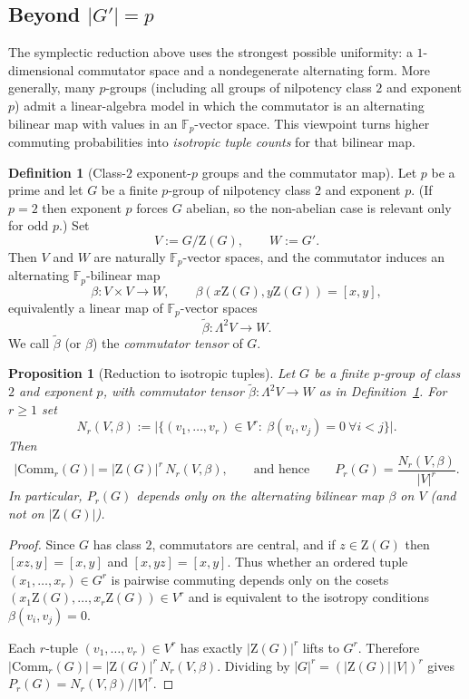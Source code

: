 \documentclass[11pt]{article}
\newtheorem{proposition}[theorem]{Proposition}
\theoremstyle{definition}
\newtheorem{definition}[theorem]{Definition}
\theoremstyle{remark}
\theoremstyle{definition}
\theoremstyle{plain}
\newcommand{\Z}{\mathrm{Z}}
\newcommand{\Comm}{\mathrm{Comm}}
\begin{document}
\subsection{Beyond \texorpdfstring{$|G'|=p$}{|G'|=p}}\label{subsec:commutator-tensor}

The symplectic reduction above uses the strongest possible uniformity: a $1$-dimensional commutator space and a
nondegenerate alternating form.
More generally, many $p$-groups (including all groups of nilpotency class $2$ and exponent $p$) admit a linear-algebra
model in which the commutator is an alternating bilinear map with values in an $\mathbb F_p$-vector space.
This viewpoint turns higher commuting probabilities into \emph{isotropic tuple counts} for that bilinear map.

\begin{definition}[Class-$2$ exponent-$p$ groups and the commutator map]\label{def:class2-exp-p}
Let $p$ be a prime and let $G$ be a finite $p$-group of nilpotency class $2$ and exponent $p$.
(If $p=2$ then exponent $p$ forces $G$ abelian, so the non-abelian case is relevant only for odd $p$.)
Set
\[
V:=G/\Z(G),\qquad W:=G'.
\]
Then $V$ and $W$ are naturally $\mathbb F_p$-vector spaces, and the commutator induces an alternating $\mathbb F_p$-bilinear map
\[
\beta:V\times V\to W,\qquad \beta(x\Z(G),y\Z(G))=[x,y],
\]
equivalently a linear map of $\mathbb F_p$-vector spaces
\[
\widetilde\beta:\Lambda^2 V\to W.
\]
We call $\widetilde\beta$ (or $\beta$) the \emph{commutator tensor} of $G$.
\end{definition}

\begin{proposition}[Reduction to isotropic tuples]\label{prop:class2-reduction}
Let $G$ be a finite $p$-group of class $2$ and exponent $p$, with commutator tensor $\widetilde\beta:\Lambda^2V\to W$
as in Definition~\ref{def:class2-exp-p}.
For $r\ge 1$ set
\[
N_r(V,\beta):=\big|\{(v_1,\dots,v_r)\in V^r:\ \beta(v_i,v_j)=0\ \forall i<j\}\big|.
\]
Then
\[
|\Comm_r(G)|=|\Z(G)|^r\,N_r(V,\beta),
\qquad\text{and hence}\qquad
P_r(G)=\frac{N_r(V,\beta)}{|V|^r}.
\]
In particular, $P_r(G)$ depends only on the alternating bilinear map $\beta$ on $V$ (and not on $|\Z(G)|$).
\end{proposition}

\begin{proof}
Since $G$ has class $2$, commutators are central, and if $z\in \Z(G)$ then $[xz,y]=[x,y]$ and $[x,yz]=[x,y]$.
Thus whether an ordered tuple $(x_1,\dots,x_r)\in G^r$ is pairwise commuting depends only on the cosets
$(x_1\Z(G),\dots,x_r\Z(G))\in V^r$ and is equivalent to the isotropy conditions $\beta(v_i,v_j)=0$.

Each $r$-tuple $(v_1,\dots,v_r)\in V^r$ has exactly $|\Z(G)|^r$ lifts to $G^r$.
Therefore $|\Comm_r(G)|=|\Z(G)|^r\,N_r(V,\beta)$.
Dividing by $|G|^r=(|\Z(G)|\,|V|)^r$ gives $P_r(G)=N_r(V,\beta)/|V|^r$.
\end{proof}
\end{document}
